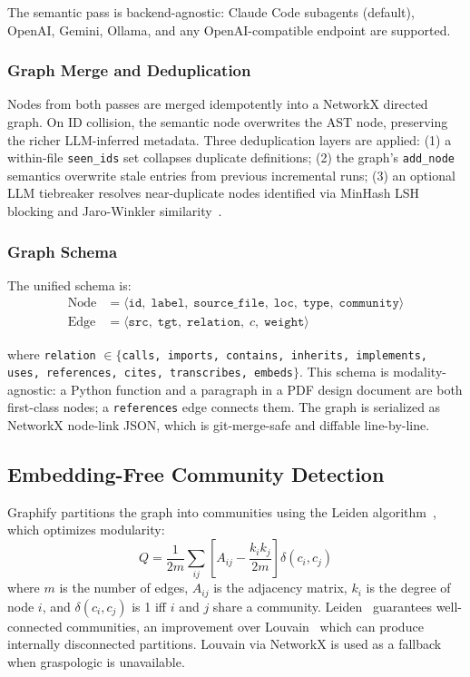 The semantic pass is backend-agnostic: Claude Code subagents (default), OpenAI,
Gemini, Ollama, and any OpenAI-compatible endpoint are supported.

\subsubsection{Graph Merge and Deduplication}

Nodes from both passes are merged idempotently into a NetworkX directed graph.
On ID collision, the semantic node overwrites the AST node, preserving the richer
LLM-inferred metadata. Three deduplication layers are applied: (1) a
within-file \texttt{seen\_ids} set collapses duplicate definitions; (2) the
graph's \texttt{add\_node} semantics overwrite stale entries from previous
incremental runs; (3) an optional LLM tiebreaker resolves near-duplicate nodes
identified via MinHash LSH~\cite{minhash} blocking and Jaro-Winkler
similarity~\cite{jaro}.

\subsubsection{Graph Schema}

The unified schema is:
\begin{align*}
  \text{Node} &= \langle \mathtt{id},\; \mathtt{label},\; \mathtt{source\_file},\;
  \mathtt{loc},\; \mathtt{type},\; \mathtt{community} \rangle \\
  \text{Edge} &= \langle \mathtt{src},\; \mathtt{tgt},\; \mathtt{relation},\;
  c,\; \mathtt{weight} \rangle
\end{align*}

\noindent where \texttt{relation} $\in \{$\texttt{calls, imports, contains,
inherits, implements, uses, references, cites, transcribes, embeds}$\}$.
This schema is modality-agnostic: a Python function and a paragraph in a PDF
design document are both first-class nodes; a \texttt{references} edge connects
them. The graph is serialized as NetworkX node-link JSON, which is git-merge-safe
and diffable line-by-line.

\subsection{Embedding-Free Community Detection}

Graphify partitions the graph into communities using the Leiden
algorithm~\cite{leiden}, which optimizes modularity:
\begin{equation}
  Q = \frac{1}{2m} \sum_{ij} \left[ A_{ij} - \frac{k_i k_j}{2m} \right]
  \delta(c_i, c_j)
  \label{eq:modularity}
\end{equation}
where $m$ is the number of edges, $A_{ij}$ is the adjacency matrix, $k_i$ is
the degree of node $i$, and $\delta(c_i, c_j)$ is 1 iff $i$ and $j$ share a
community. Leiden~\cite{leiden} guarantees well-connected communities, an
improvement over Louvain~\cite{louvain} which can produce internally disconnected
partitions. Louvain via NetworkX is used as a fallback when graspologic is
unavailable.

